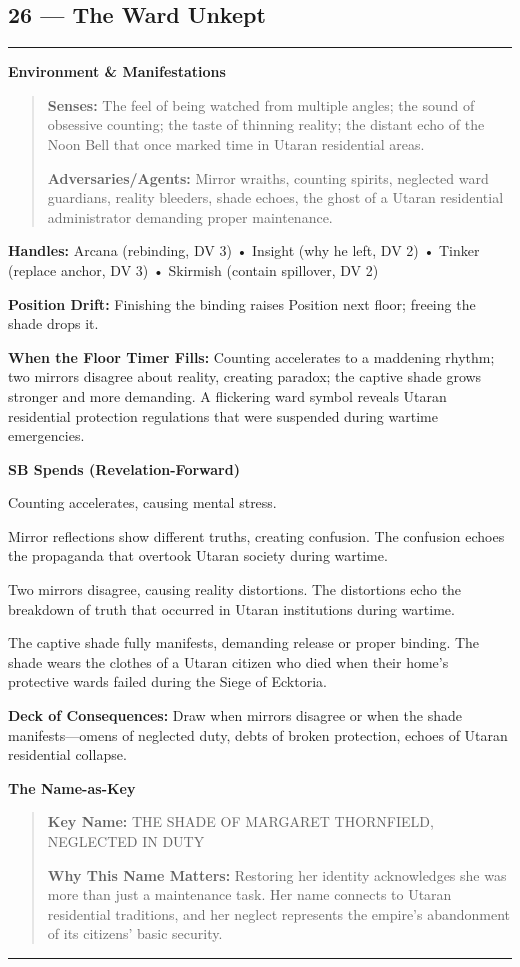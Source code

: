 \documentclass[18pt, letterpaper, twoside]{article}
\newenvironment{floorbox}[1]{%
    \begin{center}
    \begin{minipage}{0.95\textwidth}
    \subsection*{#1}
    \vspace{-0.5em}
    \rule{\textwidth}{0.5pt}
    \vspace{0.5em}
}{%
    \vspace{0.5em}
    \rule{\textwidth}{0.5pt}
    \end{minipage}
    \end{center}
}
\newenvironment{gmnote}[1]{%
    \vspace{0.5em}
    \noindent\textbf{#1}
    \begin{quote}
}{%
    \end{quote}
    \vspace{0.5em}
}
\newcommand{\handles}[1]{\noindent\textbf{Handles:} #1\par}
\newcommand{\sbitem}[2]{\item[#1 SB:] #2}
\newcommand{\deckdraw}[1]{\noindent\textbf{Deck of Consequences:} #1\par}
\newcommand{\keyname}[1]{\noindent\textbf{Key Name:} #1\par}
\newcommand{\nameimportance}[1]{\noindent\textbf{Why This Name Matters:} #1\par}
\begin{document}
\begin{floorbox}{26 --- The Ward Unkept}
\begin{gmnote}{Environment \& Manifestations}
\textbf{Senses:} The feel of being watched from multiple angles; the sound of obsessive counting; the taste of thinning reality; the distant echo of the Noon Bell that once marked time in Utaran residential areas.

\textbf{Adversaries/Agents:} Mirror wraiths, counting spirits, neglected ward guardians, reality bleeders, shade echoes, the ghost of a Utaran residential administrator demanding proper maintenance.
\end{gmnote}

\handles{Arcana (rebinding, DV 3) • Insight (why he left, DV 2) • Tinker (replace anchor, DV 3) • Skirmish (contain spillover, DV 2)}

\textbf{Position Drift:} Finishing the binding raises Position next floor; freeing the shade drops it.

\textbf{When the Floor Timer Fills:} Counting accelerates to a maddening rhythm; two mirrors disagree about reality, creating paradox; the captive shade grows stronger and more demanding. A flickering ward symbol reveals Utaran residential protection regulations that were suspended during wartime emergencies.

\textbf{SB Spends (Revelation-Forward)}
\begin{description}[leftmargin=*, style=unboxed]
    \sbitem{1}{Counting accelerates, causing mental stress.}
    \sbitem{2}{Mirror reflections show different truths, creating confusion. The confusion echoes the propaganda that overtook Utaran society during wartime.}
    \sbitem{3}{Two mirrors disagree, causing reality distortions. The distortions echo the breakdown of truth that occurred in Utaran institutions during wartime.}
    \sbitem{4+}{The captive shade fully manifests, demanding release or proper binding. The shade wears the clothes of a Utaran citizen who died when their home's protective wards failed during the Siege of Ecktoria.}
\end{description}

\deckdraw{Draw when mirrors disagree or when the shade manifests---omens of neglected duty, debts of broken protection, echoes of Utaran residential collapse.}

\begin{gmnote}{The Name-as-Key}
\keyname{THE SHADE OF MARGARET THORNFIELD, NEGLECTED IN DUTY}
\nameimportance{Restoring her identity acknowledges she was more than just a maintenance task. Her name connects to Utaran residential traditions, and her neglect represents the empire's abandonment of its citizens' basic security.}


\end{gmnote}
\end{floorbox}
\end{document}
